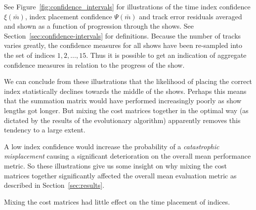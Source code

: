 \documentclass[twocolumn]{article}
\begin{document}
See Figure~\ref{fig:confidence_intervals} for illustrations of the time index confidence $\xi(\bar m)$, index placement confidence $\Psi(\bar m)$ and track error residuals averaged and shown as a function of progression through the shows. See Section~\ref{sec:confidence-intervals} for definitions. Because the number of tracks varies greatly, the confidence measures for all shows have been re-sampled into the set of indices $1,2,\ldots,15$. Thus it is possible to get an indication of aggregate confidence measures in relation to the progress of the show. 

We can conclude from these illustrations that the likelihood of placing the correct index statistically declines towards the middle of the shows. Perhaps this means that the summation matrix would have performed increasingly poorly as show lengths got longer. But mixing the cost matrices together in the optimal way (as dictated by the results of the evolutionary algorithm) apparently removes this tendency to a large extent. 

A low index confidence would increase the probability of a \textit{catastrophic misplacement} causing a significant deterioration on the overall mean performance metric. So these illustrations give us some insight on why mixing the cost matrices together significantly affected the overall mean evaluation metric as described in Section~\ref{sec:results}.    

Mixing the cost matrices had little effect on the time placement of indices. 
\end{document}
